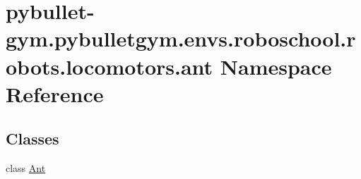 \hypertarget{namespacepybullet-gym_1_1pybulletgym_1_1envs_1_1roboschool_1_1robots_1_1locomotors_1_1ant}{}\section{pybullet-\/gym.pybulletgym.\+envs.\+roboschool.\+robots.\+locomotors.\+ant Namespace Reference}
\label{namespacepybullet-gym_1_1pybulletgym_1_1envs_1_1roboschool_1_1robots_1_1locomotors_1_1ant}
\subsection*{Classes}
\begin{DoxyCompactItemize}
\item 
class \hyperlink{classpybullet-gym_1_1pybulletgym_1_1envs_1_1roboschool_1_1robots_1_1locomotors_1_1ant_1_1_ant}{Ant}
\end{DoxyCompactItemize}
